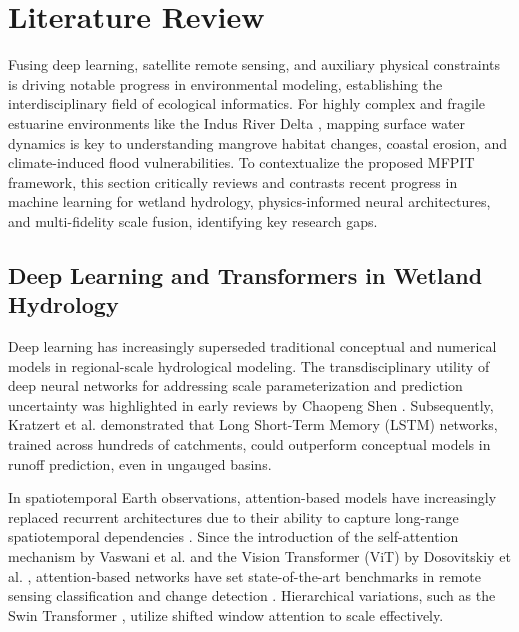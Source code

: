 \documentclass[preprint,12pt]{elsarticle}
\begin{document}
\section{Literature Review}
Fusing deep learning, satellite remote sensing, and auxiliary physical constraints is driving notable progress in environmental modeling, establishing the interdisciplinary field of ecological informatics. For highly complex and fragile estuarine environments like the Indus River Delta \cite{haider_gridded_2025}, mapping surface water dynamics is key to understanding mangrove habitat changes, coastal erosion, and climate-induced flood vulnerabilities. To contextualize the proposed MFPIT framework, this section critically reviews and contrasts recent progress in machine learning for wetland hydrology, physics-informed neural architectures, and multi-fidelity scale fusion, identifying key research gaps.

\subsection{Deep Learning and Transformers in Wetland Hydrology}
Deep learning has increasingly superseded traditional conceptual and numerical models in regional-scale hydrological modeling. The transdisciplinary utility of deep neural networks for addressing scale parameterization and prediction uncertainty was highlighted in early reviews by Chaopeng Shen \cite{shen_transdisciplinary_2018}. Subsequently, Kratzert et al. \cite{kratzert_toward_2019, kratzert_rainfallrunoff_2021} demonstrated that Long Short-Term Memory (LSTM) networks, trained across hundreds of catchments, could outperform conceptual models in runoff prediction, even in ungauged basins. 

In spatiotemporal Earth observations, attention-based models have increasingly replaced recurrent architectures due to their ability to capture long-range spatiotemporal dependencies \cite{sit_comprehensive_2020, lees_benchmarking_2021}. Since the introduction of the self-attention mechanism by Vaswani et al. \cite{vaswani_attention_2017} and the Vision Transformer (ViT) by Dosovitskiy et al. \cite{dosovitskiy_image_2021}, attention-based networks have set state-of-the-art benchmarks in remote sensing classification and change detection \cite{bazi_vision_2021}. Hierarchical variations, such as the Swin Transformer \cite{liu_swin_2021}, utilize shifted window attention to scale effectively. 
\end{document}
